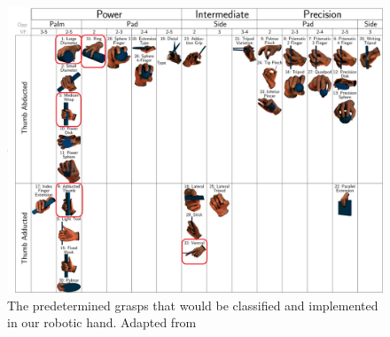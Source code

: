 \documentclass[10pt]{article}
\begin{document}
\begin{figure}[H]
    \includegraphics[width=1\linewidth]{Final Project/grasps.png}
    \caption{The predetermined grasps that would be classified and implemented in our robotic hand. Adapted from \cite{7243327}}
    \label{fig:grasps}
\end{figure}


\end{document}
